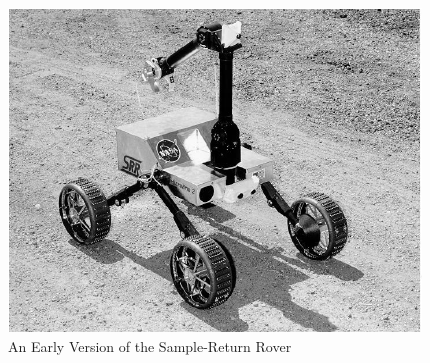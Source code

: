 %
%
%
%
\begin{figure}[htbp]
	\centering
	\includegraphics[width=.9\textwidth]{sections/introduction/images/srr.png}
	\caption{An Early Version of the Sample-Return Rover}
\end{figure}

%
